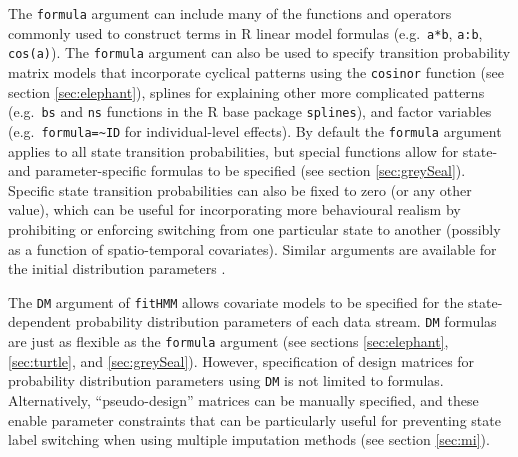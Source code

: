 \documentclass[12pt]{article}\usepackage[]{graphicx}\usepackage[]{color}
\begin{document}
The \verb|formula| argument can include many of the functions and operators commonly used to construct terms in R linear model formulas (e.g.\ \verb|a*b|, \verb|a:b|, \verb|cos(a)|). The \verb|formula| argument can also be used to specify transition probability matrix models that incorporate cyclical patterns using the \verb|cosinor| function (see section \ref{sec:elephant}), splines for explaining other more complicated patterns (e.g.\ \verb|bs| and \verb|ns| functions in the R base package \verb|splines|), and factor variables (e.g.\ \verb|formula=~ID| for individual-level effects).  By default the \verb|formula| argument applies to all state transition probabilities, but special functions allow for state- and parameter-specific formulas to be specified (see section \ref{sec:greySeal}). Specific state transition probabilities can also be fixed to zero (or any other value), which can be useful for incorporating more behavioural realism by prohibiting or enforcing switching from one particular state to another (possibly as a function of spatio-temporal covariates). Similar arguments are available for %
the initial distribution parameters%
. 

The \verb|DM| argument of \verb|fitHMM| allows covariate models to be specified for the state-dependent probability distribution parameters of each data stream. %
\verb|DM| formulas are just as flexible as the \verb|formula| argument %
(see sections \ref{sec:elephant}, \ref{sec:turtle}, and \ref{sec:greySeal}). However, specification of design matrices for probability distribution parameters using \verb|DM| is not limited to formulas. Alternatively, ``pseudo-design'' matrices can be manually specified, and these enable parameter constraints that can be particularly useful for preventing state label switching when using multiple imputation methods (see section \ref{sec:mi}). %
\end{document}
